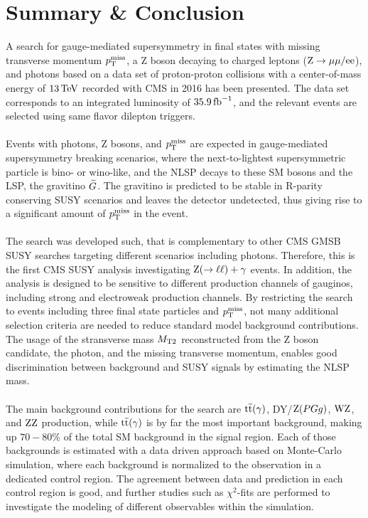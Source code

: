 \chapter{Summary \& Conclusion}\label{chap:conclusion}

A search for gauge-mediated supersymmetry in final states with missing transverse momentum $p_{\mathrm{T}}^\text{miss}$, a Z boson decaying to charged leptons ($\mathrm{Z}\to{\mu}\mu/\mathrm{e}\mathrm{e}$), and photons based on a data set of proton-proton collisions with a center-of-mass energy of $13\,\text{Te\hspace{-.08em}V}$ recorded with CMS in 2016 has been presented. The data set corresponds to an integrated luminosity of $35.9\mbox{\ensuremath{\,\text{fb}^\text{$-$1}}}$, and the relevant events are selected using same flavor dilepton triggers.\\\\
Events with photons, Z bosons, and $p_{\mathrm{T}}^\text{miss}$ are expected in gauge-mediated supersymmetry breaking scenarios, where the next-to-lightest supersymmetric particle is bino- or wino-like, and the NLSP decays to these SM bosons and the LSP, the gravitino $\widetilde{G}$. The gravitino is predicted to be stable in R-parity conserving SUSY scenarios and leaves the detector undetected, thus giving rise to a significant amount of $p_{\mathrm{T}}^\text{miss}$ in the event.\\\\
The search was developed such, that is complementary to other CMS GMSB SUSY searches targeting different scenarios including photons. Therefore, this is the first CMS SUSY analysis investigating $\mathrm{Z}(\to\ell\ell)+\gamma$ events. In addition, the analysis is designed to be sensitive to different production channels of gauginos, including strong and electroweak production channels. By restricting the search to events including three final state particles and $p_{\mathrm{T}}^\text{miss}$, not many additional selection criteria are needed to reduce standard model background contributions. The usage of the stransverse mass $M_{\mathrm{T2}}$ reconstructed from the Z boson candidate, the photon, and the missing transverse momentum, enables good discrimination between background and SUSY signals by estimating the NLSP mass.\\\\
The main background contributions for the search are ${\mathrm{t}\overline{\mathrm{t}}}(\gamma)$, DY/$\mathrm{Z}(PGg)$, $\mathrm{W}\mathrm{Z}$, and $\mathrm{Z}\mathrm{Z}$ production, while ${\mathrm{t}\overline{\mathrm{t}}}(\gamma)$ is by far the most important background, making up $70-80\%$ of the total SM background in the signal region. Each of those backgrounds is estimated with a data driven approach based on Monte-Carlo simulation, where each background is normalized to the observation in a dedicated control region. The agreement between data and prediction in each control region is good, and further studies such as $\chi^2$-fits are performed to investigate the modeling of different observables within the simulation.\\
